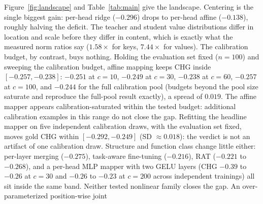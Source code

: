 \documentclass[10pt]{article}
\begin{document}
Figure~\ref{fig:landscape} and Table~\ref{tab:main} give the landscape.
Centering is the single biggest gain: per-head ridge ($-0.296$) drops to
per-head affine ($-0.138$), roughly halving the deficit. The teacher and
student value distributions differ in location and scale before they differ
in content, which is exactly what the measured norm ratios say ($1.58\times$
for keys, $7.44\times$ for values). The calibration budget, by contrast,
buys nothing. Holding the evaluation set fixed ($n{=}100$) and sweeping the
calibration budget, affine mapping keeps CHG
inside $[-0.257, -0.238]$: $-0.251$ at $c{=}10$, $-0.249$ at $c{=}30$,
$-0.238$ at $c{=}60$, $-0.257$ at $c{=}100$, and $-0.244$ for the full
calibration pool (budgets beyond the pool size saturate and reproduce the
full-pool result exactly), a spread of $0.019$. The affine mapper appears
calibration-saturated within the tested budget: additional calibration examples
in this range do not close the gap. Refitting the headline
mapper on five independent calibration draws, with the evaluation set fixed,
moves gold CHG within $[-0.292, -0.249]$ (SD $\approx 0.018$): the verdict
is not an artifact of one calibration draw. Structure and function
class change little either: per-layer merging ($-0.275$), task-aware
fine-tuning ($-0.216$), RAT ($-0.221$ to $-0.268$), and a per-head MLP mapper
with two GELU layers (CHG $-0.39$ to $-0.26$ at $c{=}30$ and $-0.26$ to
$-0.23$ at $c{=}200$ across independent trainings) all sit inside the same
band. Neither tested nonlinear family closes the gap. An over-parameterized
position-wise joint
\end{document}
